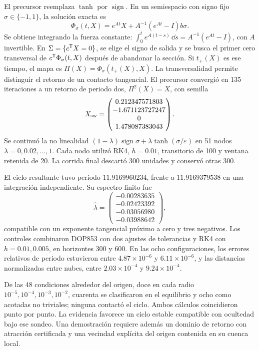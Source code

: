 El precursor reemplaza \(\tanh\) por \(\operatorname{sign}\).
En un semiespacio con signo fijo \(\sigma\in\{-1,1\}\), la solución exacta
es
\begin{equation}
 \Phi_\sigma(t,X)=e^{At}X+A^{-1}(e^{At}-I)b\sigma.
 \label{bre:res:kalman-flow}
\end{equation}
Se obtiene integrando la fuerza constante:
\(\int_0^t e^{A(t-s)}\,\dd s=A^{-1}(e^{At}-I)\), con \(A\) invertible.
En \(\Sigma=\{c^{\mathsf T}X=0\}\), se elige el signo de salida y se busca el
primer cero transversal de \(c^{\mathsf T}\Phi_\sigma(t,X)\) después de abandonar
la sección. Si \(t_+(X)\) es ese tiempo, el mapa es
\(\Pi(X)=\Phi_\sigma(t_+(X),X)\). La transversalidad permite distinguir
el retorno de un contacto tangencial. El precursor convergió en 135
iteraciones a un retorno de periodo dos, \(\Pi^2(X)=X\), con semilla
\[
 X_{\rm sw}=\begin{pmatrix}
 0.212347571803\\-1.671123727247\\0\\1.478087383043
 \end{pmatrix}.
\]
Se continuó la no linealidad
\((1-\lambda)\operatorname{sign}\sigma+
\lambda\tanh(\sigma/\varepsilon)\) en 51 nodos
\(\lambda=0,0.02,\ldots,1\). Cada nodo utilizó RK4, \(h=0.01\),
transitorio de 100 y ventana retenida de 20. La corrida final descartó
300 unidades y conservó otras 300.

El ciclo resultante tuvo periodo \(11.9169960234\), frente a
\(11.9169379538\) en una integración independiente. Su espectro finito
fue
\[
 \widehat\lambda=\begin{pmatrix}
 -0.00283635\\-0.02423392\\-0.03056980\\-0.03988642
 \end{pmatrix},
\]
compatible con un exponente tangencial próximo a cero y tres negativos.
Los controles combinaron DOP853 con dos ajustes de tolerancias y RK4 con
\(h=0.01,0.005\), en horizontes 300 y 600. En las ocho configuraciones,
los errores relativos de periodo estuvieron entre \(4.87\times10^{-6}\)
y \(6.11\times10^{-6}\), y las distancias normalizadas entre nubes,
entre \(2.03\times10^{-4}\) y \(9.24\times10^{-4}\).

De las 48 condiciones alrededor del origen, doce en cada radio
\(10^{-5},10^{-4},10^{-3},10^{-2}\), cuarenta se clasificaron en el
equilibrio y ocho como acotadas no triviales; ninguna contactó el ciclo.
Ambos cálculos coincidieron punto por punto. La evidencia favorece un
ciclo estable compatible con ocultedad bajo ese sondeo. Una demostración
requiere además un dominio de retorno con atracción certificada y una
vecindad explícita del origen contenida en su cuenca local.

